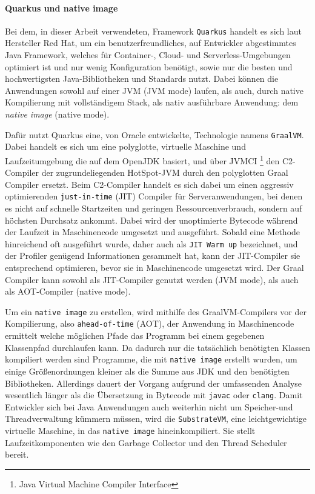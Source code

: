 \paragraph{Quarkus und native image}

Bei dem, in dieser Arbeit verwendeten, Framework \verb|Quarkus| handelt es sich laut Hersteller Red Hat, um ein
benutzerfreundliches, auf Entwickler abgestimmtes Java Framework, welches für Container-, Cloud- und Serverless-Umgebungen optimiert ist und nur wenig
Konfiguration benötigt, sowie nur die besten und hochwertigsten Java-Bibliotheken und Standards nutzt.
Dabei können die Anwendungen sowohl auf einer JVM (JVM mode) laufen, als auch, durch native Kompilierung mit vollständigem Stack,
als nativ ausführbare Anwendung: dem \textit{native image} (native mode).

Dafür nutzt Quarkus eine, von Oracle entwickelte, Technologie namens \verb|GraalVM|.
Dabei handelt es sich um eine polyglotte, virtuelle Maschine und Laufzeitumgebung die auf dem OpenJDK basiert, und über
JVMCI \footnote{Java Virtual Machine Compiler Interface} den C2-Compiler der zugrundeliegenden HotSpot-JVM durch den
polyglotten Graal Compiler ersetzt.\parencite{GraalVM}
Beim C2-Compiler handelt es sich dabei um einen aggressiv optimierenden \verb|just-in-time| (JIT) Compiler für Serveranwendungen, bei denen es nicht auf
schnelle Startzeiten und geringen Ressourcenverbrauch, sondern auf höchsten Durchsatz ankommt.
Dabei wird der unoptimierte Bytecode während der Laufzeit in Maschinencode umgesetzt und ausgeführt. Sobald eine Methode hinreichend oft
ausgeführt wurde, daher auch als \verb|JIT Warm up| bezeichnet, und der Profiler genügend Informationen gesammelt hat, kann der JIT-Compiler
sie entsprechend optimieren, bevor sie in Maschinencode umgesetzt wird.
Der Graal Compiler kann sowohl als JIT-Compiler genutzt werden (JVM mode), als auch als AOT-Compiler (native mode).\newline

Um ein \verb|native image| zu erstellen, wird mithilfe des GraalVM-Compilers vor der Kompilierung, also \verb|ahead-of-time| (AOT), der Anwendung in Maschinencode
ermittelt welche möglichen Pfade das Programm bei einem gegebenen Klassenpfad durchlaufen kann. Da dadurch nur die tatsächlich benötigten Klassen
kompiliert werden sind Programme, die mit \verb|native image| erstellt wurden, um einige Größenordnungen kleiner als die Summe aus
JDK und den benötigten Bibliotheken.
Allerdings dauert der Vorgang aufgrund der umfassenden Analyse wesentlich länger als die Übersetzung in Bytecode mit \verb|javac| oder \verb|clang|.
Damit Entwickler sich bei Java Anwendungen auch weiterhin nicht um Speicher-und Threadverwaltung kümmern müssen, wird die \verb|SubstrateVM|, eine
leichtgewichtige virtuelle Maschine, in das \verb|native image| hineinkompiliert.
Sie stellt Laufzeitkomponenten wie den Garbage Collector und den Thread Scheduler bereit.

